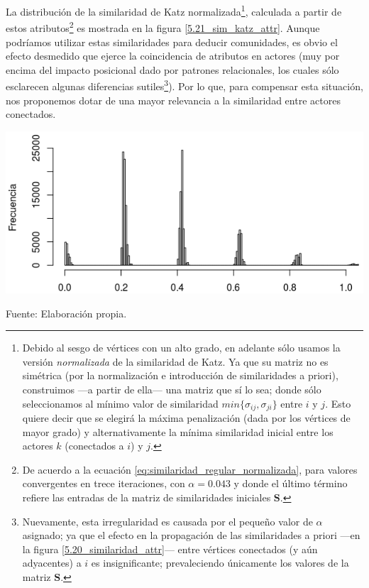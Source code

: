 \documentclass[letterpaper, 11pt]{book}
\theoremstyle{definition}
\theoremstyle{remark}
\begin{document}
La distribución de la similaridad de Katz normalizada\footnote{
    Debido al sesgo de vértices con un alto grado, en adelante sólo usamos la versión \emph{normalizada} de la similaridad de Katz. 
    Ya que su matriz no es simétrica (por la normalización e introducción de similaridades a priori), construimos ---a partir de ella--- una matriz que sí lo sea; donde sólo seleccionamos al mínimo valor de similaridad $min\{\sigma_{ij},\sigma_{ji}\}$ entre $i$ y $j$. 
    Esto quiere decir que se elegirá la máxima penalización (dada por los vértices de mayor grado) y alternativamente la mínima similaridad inicial entre los actores $k$ (conectados a $i$) y $j$. 
}, 
calculada a partir de estos atributos\footnote{
    De acuerdo a la ecuación \ref{eq:similaridad_regular_normalizada}, para valores convergentes en trece iteraciones, con $\alpha=0.043$ y donde el último término refiere las entradas de la matriz de similaridades iniciales $\mathbf{S}$. 
} es mostrada en la figura \ref{5.21_sim_katz_attr}. 
Aunque podríamos utilizar estas similaridades para deducir comunidades, es obvio el efecto desmedido que ejerce la coincidencia de atributos en actores (muy por encima del impacto posicional dado por patrones relacionales, los cuales sólo esclarecen algunas diferencias sutiles\footnote{
    Nuevamente, esta irregularidad es causada por el pequeño valor de $\alpha$ asignado; ya que el efecto en la propagación de las similaridades a priori ---en la figura \ref{5.20_similaridad_attr}--- entre vértices conectados (y aún adyacentes) a $i$ es insignificante; prevaleciendo únicamente los valores de la matriz $\mathbf{S}$. 
}). 
Por lo que, para compensar esta situación, nos proponemos dotar de una mayor relevancia a la similaridad entre actores conectados. 


\begin{minipage}{\linewidth}
\centering
{} \label{5.21_sim_katz_attr}
\includegraphics[scale=0.68]{img/5.21_sim_katz_attr.png}
\par\bigskip
\small Fuente: Elaboración propia. 
\end{minipage}\bigskip
\end{document}
